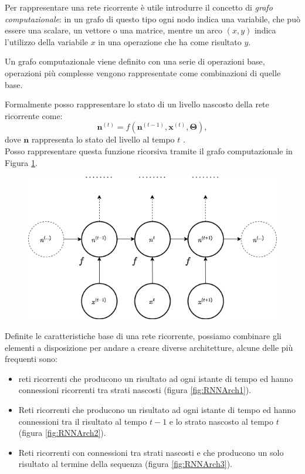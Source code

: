 \documentclass[../../main.tex]{subfiles}
\begin{document}
Per rappresentare una rete ricorrente è utile introdurre il concetto di \textit{grafo computazionale}: in un grafo di questo tipo ogni nodo indica una variabile, che può essere una scalare, un vettore o una matrice, mentre un arco $(x,y)$ indica l'utilizzo della variabile $x$ in una operazione che ha come risultato $y$.

Un grafo computazionale viene definito con una serie di operazioni base, operazioni più complesse vengono rappresentate come combinazioni di quelle base.

Formalmente posso rappresentare lo stato di un livello nascosto della rete ricorrente come:
\[\boldsymbol{n}^{(t)} = f(\boldsymbol{n}^{(t-1)}, \boldsymbol{x}^{(t)}, \boldsymbol{\Theta}),\]
dove $\boldsymbol{n}$ rappresenta lo stato del livello al tempo $t$ .\\
Posso rappresentare questa funzione ricorsiva tramite il grafo computazionale in Figura \ref{fig:computationgraph}.
\begin{figure}[H]
    \centering
    \includegraphics[scale = 0.4]{immagini/4_2/computation_graph.png}
    \caption{}
    \label{fig:computationgraph}
\end{figure}

Definite le caratteristiche base di una rete ricorrente, possiamo combinare gli elementi a disposizione per andare a creare diverse architetture, alcune delle più frequenti sono:

\begin{itemize}
    \item reti ricorrenti che producono un risultato ad ogni istante di tempo ed hanno connessioni ricorrenti tra strati nascosti (figura \ref{fig:RNNArch1}).
    \item Reti ricorrenti che producono un risultato ad ogni istante di tempo ed hanno connessioni tra il risultato al tempo $t-1$ e lo strato nascosto al tempo $t$ (figura \ref{fig:RNNArch2}).
    \item Reti ricorrenti con connessioni tra strati nascosti e che producono un solo risultato al termine della sequenza (figura \ref{fig:RNNArch3}).
\end{itemize}
\end{document}
